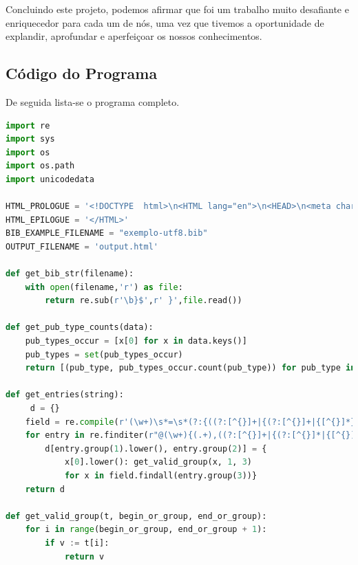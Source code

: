 \documentclass[11pt,a4paper]{report}
\begin{document}
Concluindo este projeto, podemos afirmar que foi um trabalho muito
desafiante e enriquecedor para cada um de nós, uma vez que tivemos a
oportunidade de explandir, aprofundar e aperfeiçoar os nossos conhecimentos.
\appendix
\begin{appendices}
\chapter{Código do Programa}
De seguida lista-se o programa completo.
\begin{lstlisting}[language=python]
import re
import sys
import os
import os.path
import unicodedata

HTML_PROLOGUE = '<!DOCTYPE  html>\n<HTML lang="en">\n<HEAD>\n<meta charset="utf-8">\n      <TITLE>Categories in BibTeX</TITLE>\n <script type="text/x-mathjax-config"> MathJax.Hub.Config({"extensions":["tex2jax.js"],"jax":["input/TeX","output/HTML-CSS"],"messageStyle":"none","tex2jax":{"processEnvironments":false,"processEscapes":true,"inlineMath":[["$","$"]],"displayMath":[["$$","$$"],["\\[","\\]"]]},"TeX":{"extensions":["AMSmath.js","AMSsymbols.js","noErrors.js","noUndefined.js"]},"HTML-CSS":{"availableFonts":["TeX"]}}); </script> <script type="text/javascript" async src="file:////home/useralef/.vscode/extensions/shd101wyy.markdown-preview-enhanced-0.6.1/node_modules/@shd101wyy/mume/dependencies/mathjax/MathJax.js" charset="UTF-8"></script>  </HEAD>\n'
HTML_EPILOGUE = '</HTML>'
BIB_EXAMPLE_FILENAME = "exemplo-utf8.bib"
OUTPUT_FILENAME = 'output.html'

def get_bib_str(filename):
    with open(filename,'r') as file:
        return re.sub(r'\b}$',r' }',file.read())

def get_pub_type_counts(data):
    pub_types_occur = [x[0] for x in data.keys()]
    pub_types = set(pub_types_occur)
    return [(pub_type, pub_types_occur.count(pub_type)) for pub_type in pub_types]

def get_entries(string):
     d = {}
    field = re.compile(r'(\w+)\s*=\s*(?:{((?:[^{}]+|{(?:[^{}]+|{[^{}]*})+})+)}|"([^"]+)"|(\d+))')
    for entry in re.finditer(r"@(\w+){(.+),((?:[^{}]+|{(?:[^{}]*|{[^{}]*})+})+)", string):
        d[entry.group(1).lower(), entry.group(2)] = {
            x[0].lower(): get_valid_group(x, 1, 3)
            for x in field.findall(entry.group(3))}
    return d

def get_valid_group(t, begin_or_group, end_or_group):
    for i in range(begin_or_group, end_or_group + 1):
        if v := t[i]:
            return v


\end{lstlisting}
\end{appendices}
\end{document}
